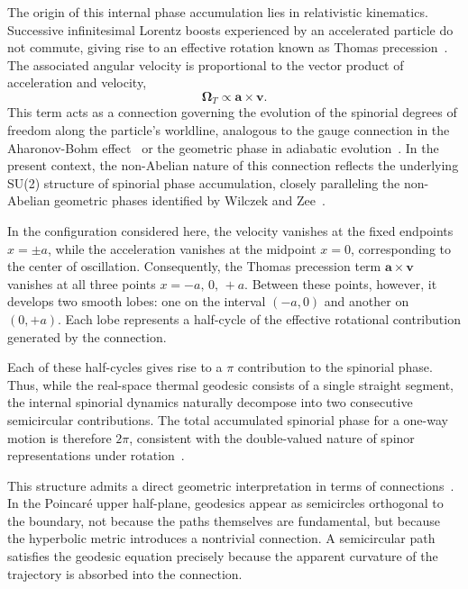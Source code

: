 \documentclass[%
 reprint,
 amsmath,amssymb,
 aps,
 prb,
]{revtex4-2}
\numberwithin{equation}{section}
\begin{document}
The origin of this internal phase accumulation lies in relativistic kinematics. Successive infinitesimal Lorentz boosts experienced by an accelerated particle do not commute, giving rise to an effective rotation known as Thomas precession~\cite{thomas1926,Jackson1999,bjorken1964}. The associated angular velocity is proportional to the vector product of acceleration and velocity,
\begin{equation}
\boldsymbol{\Omega}_{T} \propto \mathbf{a} \times \mathbf{v}.
\end{equation}
This term acts as a connection governing the evolution
of the spinorial degrees of freedom along the particle’s
worldline, analogous to the gauge connection in the
Aharonov-Bohm effect~\cite{aharonov1959} or the
geometric phase in adiabatic evolution~\cite{berry1984}.
In the present context, the non-Abelian nature of this
connection reflects the underlying SU(2) structure of
spinorial phase accumulation, closely paralleling the
non-Abelian geometric phases identified by
Wilczek and Zee~\cite{wilczekZee1984}.


In the configuration considered here, the velocity vanishes at the fixed endpoints $x=\pm a$, while the acceleration vanishes at the midpoint $x=0$, corresponding to the center of oscillation. Consequently, the Thomas precession term $\mathbf{a}\times\mathbf{v}$ vanishes at all three points $x=-a,\,0,\,+a$. Between these points, however, it develops two smooth lobes: one on the interval $(-a,0)$ and another on $(0,+a)$. Each lobe represents a half-cycle of the effective rotational contribution generated by the connection.

Each of these half-cycles gives rise to a $\pi$ contribution to the spinorial phase. Thus, while the real-space thermal geodesic consists of a single straight segment, the internal spinorial dynamics naturally decompose into two consecutive semicircular contributions. The total accumulated spinorial phase for a one-way motion is therefore $2\pi$, consistent with the double-valued nature of spinor representations under rotation~\cite{sakurai2017,ballentine1998}.

This structure admits a direct geometric interpretation in terms of connections~\cite{nakahara2003}. In the Poincaré upper half-plane, geodesics appear as semicircles orthogonal to the boundary, not because the paths themselves are fundamental, but because the hyperbolic metric introduces a nontrivial connection. A semicircular path satisfies the geodesic equation precisely because the apparent curvature of the trajectory is absorbed into the connection.
\end{document}
